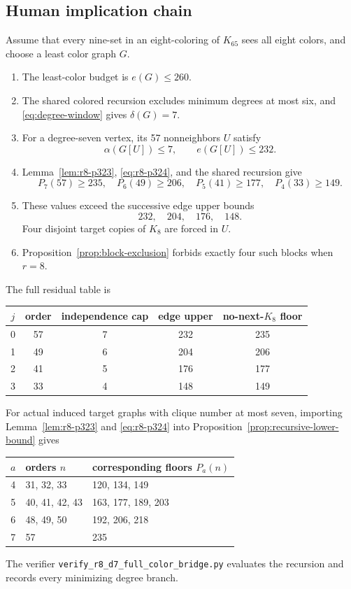 \documentclass[11pt,reqno,a4paper]{amsart}
\theoremstyle{definition}
\theoremstyle{remark}
\begin{document}
\subsection{Human implication chain}

Assume that every nine-set in an eight-coloring of $K_{65}$ sees all eight
colors, and choose a least color graph $G$.
\begin{enumerate}[label=\textup{R8.\arabic*},leftmargin=3.5em]
\item The least-color budget is $e(G)\leq260$.
\item The shared colored recursion excludes minimum degrees at most six,
  and \eqref{eq:degree-window} gives $\delta(G)=7$.
\item For a degree-seven vertex, its 57 nonneighbors $U$ satisfy
  \[
    \alpha(G[U])\leq7,
    \qquad e(G[U])\leq232.
  \]
\item Lemma~\ref{lem:r8-p323}, \eqref{eq:r8-p324}, and the shared
  recursion give
  \[
    P_7(57)\geq235,
    \quad P_6(49)\geq206,
    \quad P_5(41)\geq177,
    \quad P_4(33)\geq149.
  \]
\item These values exceed the successive edge upper bounds
  \[
    232,\quad204,\quad176,\quad148.
  \]
  Four disjoint target copies of $K_8$ are forced in $U$.
\item Proposition~\ref{prop:block-exclusion} forbids exactly four such
  blocks when $r=8$.
\end{enumerate}

The full residual table is
\begin{center}
\begin{tabular}{c@{\quad}c@{\quad}c@{\quad}c@{\quad}c}
\toprule
$j$&order&independence cap&edge upper&no-next-$K_8$ floor\\
\midrule
0&57&7&232&235\\
1&49&6&204&206\\
2&41&5&176&177\\
3&33&4&148&149\\
\bottomrule
\end{tabular}
\end{center}

For actual induced target graphs with clique number at most seven, importing
Lemma~\ref{lem:r8-p323} and \eqref{eq:r8-p324} into
Proposition~\ref{prop:recursive-lower-bound} gives
\begin{center}
\begin{tabular}{c@{\qquad}l@{\qquad}l}
\toprule
$a$&orders $n$&corresponding floors $P_a(n)$\\
\midrule
4&31, 32, 33&120, 134, 149\\
5&40, 41, 42, 43&163, 177, 189, 203\\
6&48, 49, 50&192, 206, 218\\
7&57&235\\
\bottomrule
\end{tabular}
\end{center}
The verifier \texttt{verify\_r8\_d7\_full\_color\_bridge.py} evaluates
the recursion and records every minimizing degree branch.
\end{document}

